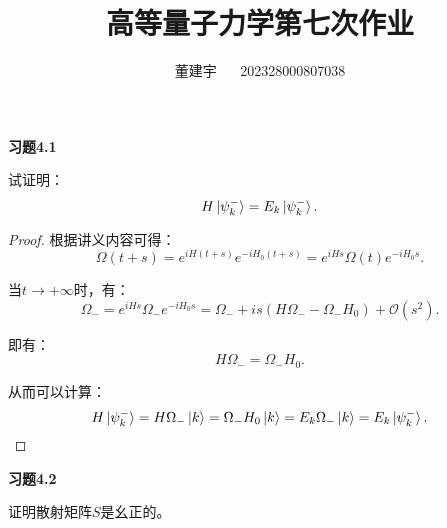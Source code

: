 \documentclass[reqno,a4paper,12pt]{amsart}
\title{高等量子力学第七次作业}
\author{董建宇 ~~ 202328000807038}
\begin{document}
\maketitle

\textbf{习题4.1}

试证明：
\[
	H \ket{\psi_k^-} = E_k \ket{\psi_k^-}.
\]

\begin{proof}
根据讲义内容可得：
\[
	\Omega(t+s) = e^{iH(t+s)} e^{-iH_0(t+s)} = e^{iHs} \Omega(t) e^{-iH_0s}.
\]

当$t\to +\infty$时，有：
\[
	\Omega_- = e^{iHs} \Omega_- e^{-iH_0s} = \Omega_- + is(H\Omega_- - \Omega_-H_0) + \mathcal{O}(s^2).
\]

即有：
\[
	H\Omega_- = \Omega_- H_0.
\]

从而可以计算：
\[
	H \ket{\psi_k^-} = H\Omega_- \ket{k} = \Omega_- H_0 \ket{k} = E_k \Omega_- \ket{k} = E_k \ket{\psi_k^-}.
\]
\end{proof}

\medskip

\textbf{习题4.2}

证明散射矩阵$S$是幺正的。
\end{document}
